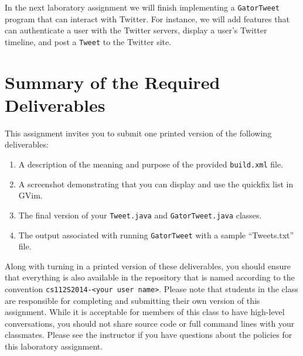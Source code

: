 In the next laboratory assignment we will finish implementing a {\tt GatorTweet} program that can interact with Twitter. For
instance, we will add features that can authenticate a user with the Twitter servers, display a user's Twitter timeline, and post
a {\tt Tweet} to the Twitter site.

\section*{Summary of the Required Deliverables}

  This assignment invites you to submit one printed version of the following deliverables: 

  \begin{enumerate}
    \item A description of the meaning and purpose of the provided {\tt build.xml} file.
    \item A screenshot demonstrating that you can display and use the quickfix list in GVim.
    \item The final version of your {\tt Tweet.java} and {\tt GatorTweet.java} classes.
    \item The output associated with running {\tt GatorTweet} with a sample ``Tweets.txt'' file.
  \end{enumerate}

  Along with turning in a printed version of these deliverables, you should ensure that everything is also available in the
  repository that is named according to the convention {\tt cs112S2014-<your user name>}. Please note that students in the class
  are responsible for completing and submitting their own version of this assignment.    While it is acceptable for members of
  this class to have high-level conversations, you should not share source code or full command lines with your classmates.
  Please see the instructor if you have questions about the policies for this laboratory assignment.

  
